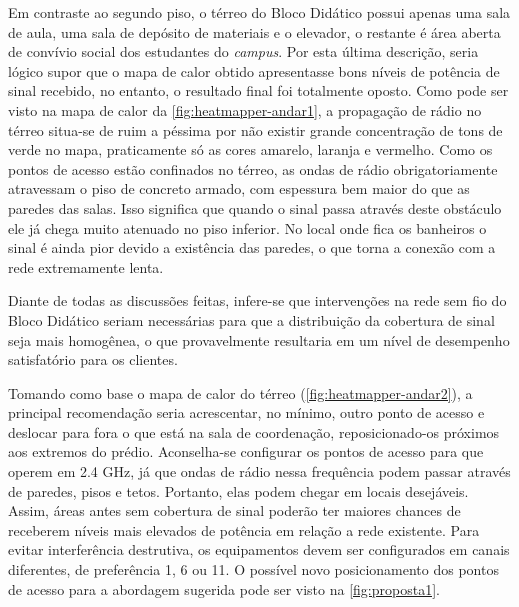 Em contraste ao segundo piso, o térreo do Bloco Didático possui apenas uma sala de aula, uma sala de depósito de materiais e o elevador, o restante é área aberta de convívio social dos estudantes do \textit{campus}. Por esta última descrição, seria lógico supor que o mapa de calor obtido apresentasse bons níveis de potência de sinal recebido, no entanto, o resultado final foi totalmente oposto. Como pode ser visto na mapa de calor da \autoref{fig:heatmapper-andar1}, a propagação de rádio no térreo situa-se de ruim a péssima por não existir grande concentração de tons de verde no mapa, praticamente só as cores amarelo, laranja e vermelho. Como os pontos de acesso estão confinados no térreo, as ondas de rádio obrigatoriamente atravessam o piso de concreto armado, com espessura bem maior do que as paredes das salas. Isso significa que quando o sinal passa através deste obstáculo ele já chega muito atenuado no piso inferior. No local onde fica os banheiros o sinal é ainda pior devido a existência das paredes, o que torna a conexão com a rede extremamente lenta.

Diante de todas as discussões feitas, infere-se que intervenções na rede sem fio do Bloco Didático seriam necessárias para que a distribuição da cobertura de sinal seja mais homogênea, o que provavelmente resultaria em um nível de desempenho satisfatório para os clientes.

Tomando como base o mapa de calor do térreo (\autoref{fig:heatmapper-andar2}), a principal recomendação seria acrescentar, no mínimo, outro ponto de acesso e deslocar para fora o que está na sala de coordenação, reposicionado-os próximos aos extremos do prédio. Aconselha-se configurar os pontos de acesso para que operem em 2.4 GHz, já que ondas de rádio nessa frequência podem passar através de paredes, pisos e tetos. Portanto, elas podem chegar em locais desejáveis. Assim, áreas antes sem cobertura de sinal poderão ter maiores chances de receberem níveis mais elevados de potência em relação a rede existente. Para evitar interferência destrutiva, os equipamentos devem ser configurados em canais diferentes, de preferência 1, 6 ou 11. O possível novo posicionamento dos pontos de acesso para a abordagem sugerida pode ser visto na \autoref{fig:proposta1}.

